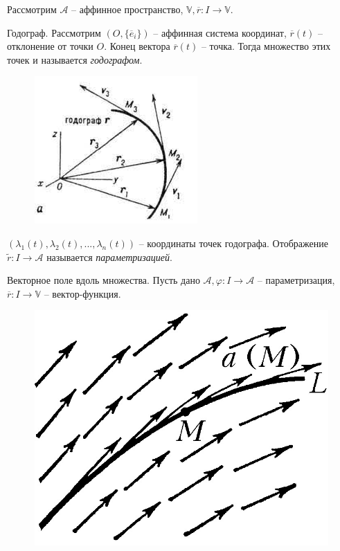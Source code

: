 \begin{Rem}
	Рассмотрим $\mathcal{A}$ -- аффинное пространство, $\mathbb{V}, \overline{r} : I \to \mathbb{V}$.

	\begin{MyList}
		\item Годограф. Рассмотрим $(O, \{\overline{e}_i\})$ -- аффинная система координат, $\overline{r}(t)$ -- отклонение от точки $O$.
		Конец вектора $\overline{r}(t)$ -- точка. Тогда множество этих точек и называется \textit{годографом}.

		\begin{figure}[H]
			\centering
			\includegraphics{img/Hodograph.jpg}
		\end{figure}

		$(\lambda_1(t), \lambda_2(t), ..., \lambda_n(t))$ -- координаты точек годографа.
		Отображение $\widetilde{r} : I \to \mathcal{A}$ называется \textit{параметризацией}.

		\item Векторное поле вдоль множества. Пусть дано $\mathcal{A}, \varphi : I \to \mathcal{A}$ -- параметризация, $\overline{r} : I \to \mathbb{V}$ -- вектор-функция.
		
		\begin{figure}[H]
			\centering
			\includegraphics{img/vector_field.jpg}
		\end{figure}
	\end{MyList}
\end{Rem}

